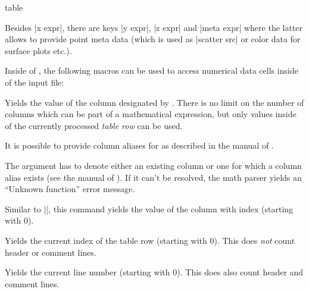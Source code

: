{\begin{addplotoperation}[]{table}{}
\begin{codeexample}[vbox]

\end{codeexample}

	Besides |x expr|, there are keys |y expr|, |z expr| and |meta expr| where the latter allows to provide point meta data (which is used as |scatter src| or color data for surface plots etc.).

	Inside of , the following macros can be used to access numerical data cells inside of the input file:

	\begin{command}{\thisrow{}}
		Yields the value of the column designated by . There is no limit on the number of columns which can be part of a mathematical expression, but only values inside of the currently processed \emph{table row} can be used.
		
		It is possible to provide column aliases for  as described in the manual of \PGFPlotstable. 

		The argument  has to denote either an existing column or one for which a column alias exists (see the manual of \PGFPlotstable). If it can't be resolved, the math parser yields an ``Unknown function'' error message.
	\end{command}
	\begin{command}{\thisrowno{}}
		Similar to |\thisrow|, this command yields the value of the column with index  (starting with $0$). 
	\end{command}
	\begin{command}{\coordindex}
		Yields the current index of the table row (starting with $0$). This does \emph{not} count header or comment lines.		
	\end{command}
	\begin{command}{\lineno}
		Yields the current line number (starting with $0$). This does also count header and comment lines.
	\end{command}


\end{addplotoperation}}
